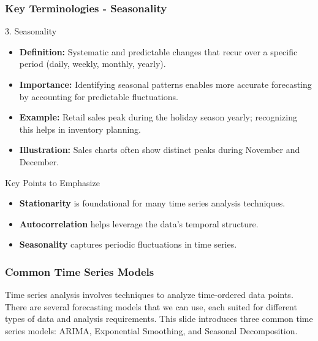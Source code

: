 \documentclass[aspectratio=169]{beamer}
\begin{document}
\begin{frame}[fragile]
    \frametitle{Key Terminologies - Seasonality}
    \begin{block}{3. Seasonality}
        \begin{itemize}
            \item \textbf{Definition:} Systematic and predictable changes that recur over a specific period (daily, weekly, monthly, yearly).
            \item \textbf{Importance:} Identifying seasonal patterns enables more accurate forecasting by accounting for predictable fluctuations.
            \item \textbf{Example:} Retail sales peak during the holiday season yearly; recognizing this helps in inventory planning.
            \item \textbf{Illustration:} Sales charts often show distinct peaks during November and December.
        \end{itemize}
        \begin{block}{Key Points to Emphasize}
            \begin{itemize}
                \item \textbf{Stationarity} is foundational for many time series analysis techniques.
                \item \textbf{Autocorrelation} helps leverage the data's temporal structure.
                \item \textbf{Seasonality} captures periodic fluctuations in time series.
            \end{itemize}
        \end{block}
    \end{block}
\end{frame}

\begin{frame}[fragile]
    \frametitle{Common Time Series Models}
    Time series analysis involves techniques to analyze time-ordered data points. There are several forecasting models that we can use, each suited for different types of data and analysis requirements. This slide introduces three common time series models: ARIMA, Exponential Smoothing, and Seasonal Decomposition.
\end{frame}
\end{document}
